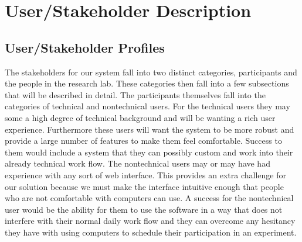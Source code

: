 \section{User/Stakeholder Description}
\subsection{User/Stakeholder Profiles}
The stakeholders for our system fall into two distinct categories, participants and the people in the research lab. These categories then fall into a few subsections that will be described in detail. The participants themselves fall into the categories of technical and nontechnical users. For the technical users they may some a high degree of technical background and will be wanting a rich user experience. Furthermore these users will want the system to be more robust and provide a large number of features to make them feel comfortable. Success to them would include a system that they can possibly custom and work into their already technical work flow. The nontechnical users may or may have had experience with any sort of web interface. This provides an extra challenge for our solution because we must make the interface intuitive enough that people who are not comfortable with computers can use. A success for the nontechnical user would be the ability for them to use the software in a way that does not interfere with their normal daily work flow and they can overcome any hesitancy they have with using computers to schedule their participation in an experiment.


